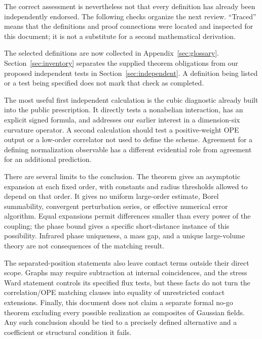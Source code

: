 \documentclass[11pt]{article}
\begin{document}
The correct assessment is nevertheless not that every definition has
already been independently endorsed. The following checks organize the
next review. ``Traced'' means that the definitions and proof connections
were located and inspected for this document; it is not a substitute
for a second mathematical derivation.

The selected definitions are now collected in
Appendix~\ref{sec:glossary}. Section~\ref{sec:inventory} separates
the supplied theorem obligations from our proposed independent
tests in Section~\ref{sec:independent}. A definition being listed
or a test being specified does not mark that check as completed.

The most useful first independent calculation is the cubic diagnostic
already built into the public prescription. It directly tests a
nonabelian interaction, has an explicit signed formula, and addresses
our earlier interest in a dimension-six curvature operator. A second
calculation should test a positive-weight OPE output or a low-order
correlator not used to define the scheme. Agreement for a defining
normalization observable has a different evidential role from agreement
for an additional prediction.

There are several limits to the conclusion. The theorem gives an
asymptotic expansion at each fixed order, with constants and radius
thresholds allowed to depend on that order. It gives no uniform
large-order estimate, Borel summability, convergent perturbation
series, or effective numerical error algorithm. Equal expansions
permit differences smaller than every power of the coupling; the
phase bound gives a specific short-distance instance of this
possibility. Infrared phase uniqueness, a mass gap, and a unique
large-volume theory are not consequences of the matching result.

The separated-position statements also leave contact terms outside
their direct scope. Graphs may require subtraction at internal
coincidences, and the stress Ward statement controls its specified
flux tests, but these facts do not turn the correlation/OPE matching
clauses into equality of unrestricted contact extensions. Finally,
this document does not claim a separate formal no-go theorem excluding
every possible realization as composites of Gaussian fields. Any
such conclusion should be tied to a precisely defined alternative
and a coefficient or structural condition it fails.
\end{document}
